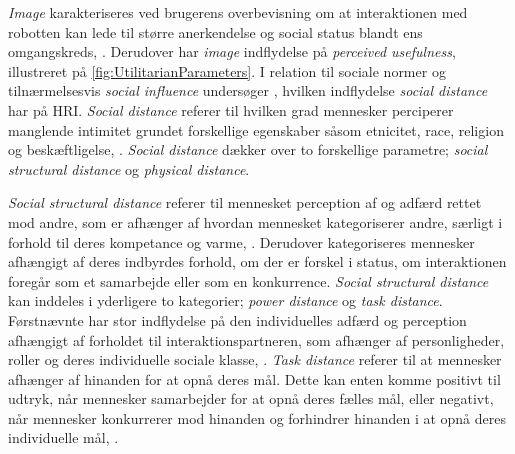 \textit{Image} karakteriseres ved brugerens overbevisning om at interaktionen med robotten kan lede til større anerkendelse og social status blandt ens omgangskreds, \parencite[s. 1478]{PDF:ExploringInfluencingVariable}. Derudover har \textit{image} indflydelse på \textit{perceived usefulness}, illustreret på \autoref{fig:UtilitarianParameters}.\blankline
%
I relation til sociale normer og tilnærmelsesvis \textit{social influence} undersøger \textcite{PDF:HowSocialDistanceShapesHRI}, hvilken indflydelse \textit{social distance} har på HRI. \textit{Social distance} referer til hvilken grad mennesker perciperer manglende intimitet grundet forskellige egenskaber såsom etnicitet, race, religion og beskæftligelse, \parencite[s. 784]{PDF:HowSocialDistanceShapesHRI}. \textit{Social distance} dækker over to forskellige parametre; \textit{social structural distance} og \textit{physical distance}.

\textit{Social structural distance} referer til mennesket perception af og adfærd rettet mod andre, som er afhænger af hvordan mennesket kategoriserer andre, særligt i forhold til deres kompetance og varme, \parencite[s. 784]{PDF:HowSocialDistanceShapesHRI}. Derudover kategoriseres mennesker afhængigt af deres indbyrdes forhold, om der er forskel i status, om interaktionen foregår som et samarbejde eller som en konkurrence. \textit{Social structural distance} kan inddeles i yderligere to kategorier; \textit{power distance} og \textit{task distance}. Førstnævnte har stor indflydelse på den individuelles adfærd og perception afhængigt af forholdet til interaktionspartneren, som afhænger af personligheder, roller og deres individuelle sociale klasse, \parencite[s. 784]{PDF:HowSocialDistanceShapesHRI}. \textit{Task distance} referer til at mennesker afhænger af hinanden for at opnå deres mål. Dette kan enten komme positivt til udtryk, når mennesker samarbejder for at opnå deres fælles mål, eller negativt, når mennesker konkurrerer mod hinanden og forhindrer hinanden i at opnå deres individuelle mål, \parencite[s. 784]{PDF:HowSocialDistanceShapesHRI}. 


